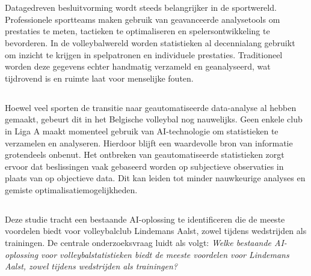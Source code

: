 
\chapter{}%
\label{ch:inleiding}

Datagedreven besluitvorming wordt steeds belangrijker in de sportwereld. Professionele sportteams maken gebruik van geavanceerde analysetools om prestaties te meten, tactieken te optimaliseren en spelersontwikkeling te bevorderen. In de volleybalwereld worden statistieken al decennialang gebruikt om inzicht te krijgen in spelpatronen en individuele prestaties. Traditioneel worden deze gegevens echter handmatig verzameld en geanalyseerd, wat tijdrovend is en ruimte laat voor menselijke fouten.

\section{}%
\label{sec:probleemstelling}

Hoewel veel sporten de transitie naar geautomatiseerde data-analyse al hebben gemaakt, gebeurt dit in het Belgische volleybal nog nauwelijks. Geen enkele club in Liga A maakt momenteel gebruik van AI-technologie om statistieken te verzamelen en analyseren. Hierdoor blijft een waardevolle bron van informatie grotendeels onbenut. Het ontbreken van geautomatiseerde statistieken zorgt ervoor dat beslissingen vaak gebaseerd worden op subjectieve observaties in plaats van op objectieve data. Dit kan leiden tot minder nauwkeurige analyses en gemiste optimalisatiemogelijkheden.

\section{}%
\label{sec:onderzoeksvraag}

Deze studie tracht een bestaande AI-oplossing te identificeren die de meeste voordelen biedt voor volleybalclub Lindemans Aalst, zowel tijdens wedstrijden als trainingen. De centrale onderzoeksvraag luidt als volgt: \textit{Welke bestaande AI-oplossing voor volleybalstatistieken biedt de meeste voordelen voor Lindemans Aalst, zowel tijdens wedstrijden als trainingen?}

